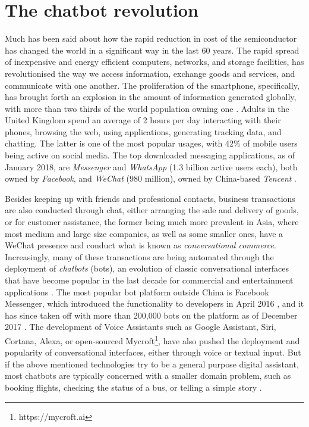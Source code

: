 \section{The chatbot revolution}
Much has been said about how the rapid reduction in cost of the semiconductor has changed the world in a significant way in the last 60 years. The rapid spread of inexpensive and energy efficient computers, networks, and storage facilities, has revolutionised the way we access information, exchange goods and services, and communicate with one another. The proliferation of the smartphone, specifically, has brought forth an explosion in the amount of information generated globally, with more than two thirds of the world population owning one \cite{wearesocial}. Adults in the United Kingdom spend an average of 2 hours per day interacting with their phones, browsing the web, using applications, generating tracking data, and chatting. The latter is one of the most popular usages, with 42\% of mobile users \cite{mobilesocial} being active on social media. The top downloaded messaging applications, as of January 2018, are \textit{Messenger} and \textit{WhatsApp} (1.3 billion active users each), both owned by \textit{Facebook}, and \textit{WeChat} (980 million), owned by China-based \textit{Tencent} \cite{mobilestatista}.

Besides keeping up with friends and professional contacts, business transactions are also conducted through chat, either arranging the sale and delivery of goods, or for customer assistance, the former being much more prevalent in Asia, where most medium and large size companies, as well as some smaller ones, have a WeChat presence and conduct what is known as \textit{conversational commerce}. Increasingly, many of these transactions are being automated through the deployment of \textit{chatbots} (bots), an evolution of classic conversational interfaces that have become popular in the last decade for commercial and entertainment applications \cite{Dale2016}. The most popular bot platform outside China is Facebook Messenger, which introduced the functionality to developers in April 2016 \cite{Messenger2016}, and it has since taken off with more than 200,000 bots on the platform as of December 2017 \cite{Messenger2017}. The development of Voice Assistants such as Google Assistant, Siri, Cortana, Alexa, or open-sourced Mycroft\footnote{https://mycroft.ai}, have also pushed the deployment and popularity of conversational interfaces, either through voice or textual input. But if the above mentioned technologies try to be a general purpose digital assistant, most chatbots are typically concerned with a smaller domain problem, such as booking flights, checking the status of a bus, or telling a simple story \cite{meisel}.
